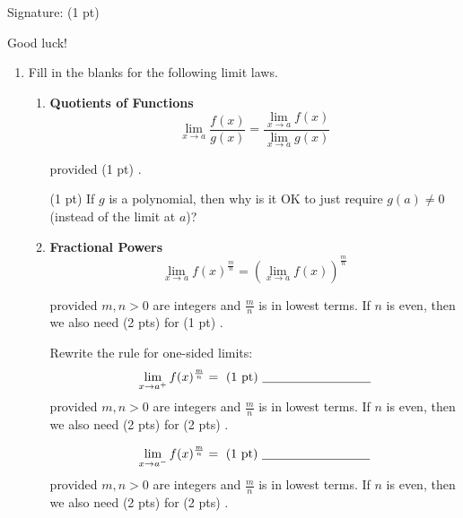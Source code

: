\documentclass[11pt,letterpaper]{article}
\begin{document}
\vspace{3pc}
Signature: (1 pt) \underline{\hspace{80ex}}

\vfill
\begin{flushright}\Large Good luck!\end{flushright}

\begin{enumerate}
\newpage

\item Fill in the blanks for the following limit laws.
\begin{enumerate}
\item {\bf Quotients of Functions} 
\[\lim_{x\to a}\frac{f(x)}{g(x)}=\frac{\displaystyle\lim_{x\to a}f(x)}{\displaystyle\lim_{x\to a}g(x)}\] 

provided (1 pt) \underline{\hspace{20ex}}.  

\vspace{2pc}
(1 pt) If $g$ is a polynomial, then why is it OK to just require $g(a)\neq 0$ (instead of the limit at $a$)?

\vspace{5pc}
\item {\bf Fractional Powers} 
\[\lim_{x\to a}f(x)^{\frac{m}{n}}=\left(\lim_{x\to a}f(x)\right)^{\frac{m}{n}}\] 

provided $m,n>0$ are integers and $\frac{m}{n}$ is in lowest terms.  If $n$ is even, then we also need  (2 pts) \underline{\hspace{20ex}} for (1 pt) \underline{\hspace{30ex}}.  

\vspace{5pc}
Rewrite the rule for one-sided limits:
\[\lim_{x\to a^+}f(x)^{\frac{m}{n}}=\text{ (1 pt) \underline{\hspace{20ex}}}\]
provided $m,n>0$ are integers and $\frac{m}{n}$ is in lowest terms.  If $n$ is even, then we also need  (2 pts) \underline{\hspace{20ex}} for (2 pts) \underline{\hspace{30ex}}.   

\vspace{3pc}
\[\lim_{x\to a^-}f(x)^{\frac{m}{n}}=\text{ (1 pt) \underline{\hspace{20ex}}}\]
provided $m,n>0$ are integers and $\frac{m}{n}$ is in lowest terms.  If $n$ is even, then we also need  (2 pts) \underline{\hspace{20ex}} for (2 pts) \underline{\hspace{30ex}}.   


\end{enumerate}
\end{enumerate}
\end{document}
